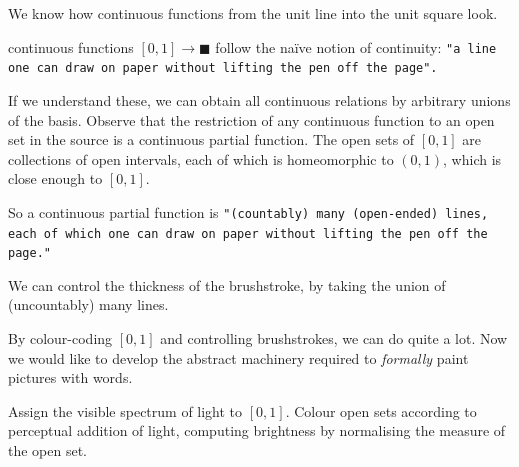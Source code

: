 \documentclass{tufte-handout}
\theoremstyle{definition}
\begin{document}
 We know how continuous functions from the unit line into the unit square look.
\begin{marginfigure}
\centering
{}
\caption{
continuous functions $[0,1] \rightarrow \blacksquare$ follow the na\"{i}ve notion of continuity: \texttt{"a line one can draw on paper without lifting the pen off the page".}
}
\label{fig:contline}
\end{marginfigure}
 If we understand these, we can obtain all continuous relations by arbitrary unions of the basis. Observe that the restriction of any continuous function to an open set in the source is a continuous partial function. The open sets of $[0,1]$ are collections of open intervals, each of which is homeomorphic to $(0,1)$, which is close enough to $[0,1]$.
%
\begin{marginfigure}
\centering
{}
\caption{
So a continuous partial function is \texttt{"(countably) many (open-ended) lines, each of which one can draw on paper without lifting the pen off the page."}
}
\label{fig:contline}
\end{marginfigure}
%
\begin{marginfigure}
\centering
{}
\caption{We can control the thickness of the brushstroke, by taking the union of (uncountably) many lines.}
\label{fig:thickbrush}
\end{marginfigure}

 By colour-coding $[0,1]$ and controlling brushstrokes, we can do quite a lot. Now we would like to develop the abstract machinery required to \emph{formally} paint pictures with words.

\begin{marginfigure}
\centering
{}
\caption{Assign the visible spectrum of light to $[0,1]$. Colour open sets according to perceptual addition of light, computing brightness by normalising the measure of the open set.}
\end{marginfigure}
\end{document}
